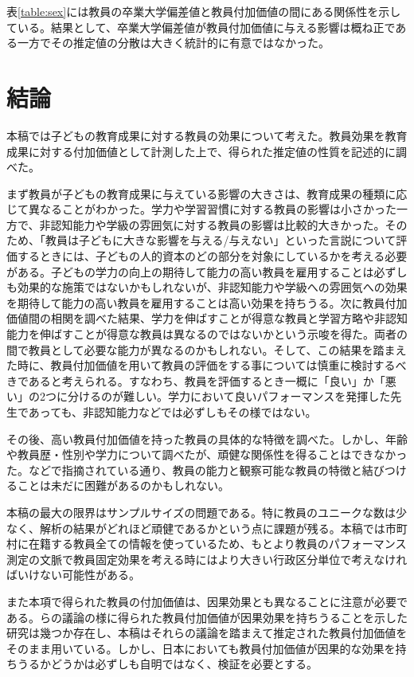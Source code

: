 \documentclass[a4paper,12pt]{article}
\begin{document}
表\ref{table:sex}には教員の卒業大学偏差値と教員付加価値の間にある関係性を示している。結果として、卒業大学偏差値が教員付加価値に与える影響は概ね正である一方でその推定値の分散は大きく統計的に有意ではなかった。

\section{結論\label{conclusion}}
本稿では子どもの教育成果に対する教員の効果について考えた。教員効果を教育成果に対する付加価値として計測した上で、得られた推定値の性質を記述的に調べた。

まず教員が子どもの教育成果に与えている影響の大きさは、教育成果の種類に応じて異なることがわかった。学力や学習習慣に対する教員の影響は小さかった一方で、非認知能力や学級の雰囲気に対する教員の影響は比較的大きかった。そのため、「教員は子どもに大きな影響を与える/与えない」といった言説について評価するときには、子どもの人的資本のどの部分を対象にしているかを考える必要がある。子どもの学力の向上の期待して能力の高い教員を雇用することは必ずしも効果的な施策ではないかもしれないが、非認知能力や学級への雰囲気への効果を期待して能力の高い教員を雇用することは高い効果を持ちうる。次に教員付加価値間の相関を調べた結果、学力を伸ばすことが得意な教員と学習方略や非認知能力を伸ばすことが得意な教員は異なるのではないかという示唆を得た。両者の間で教員として必要な能力が異なるのかもしれない。そして、この結果を踏まえた時に、教員付加価値を用いて教員の評価をする事については慎重に検討するべきであると考えられる。すなわち、教員を評価するとき一概に「良い」か「悪い」の2つに分けるのが難しい。学力において良いパフォーマンスを発揮した先生であっても、非認知能力などでは必ずしもその様ではない。

その後、高い教員付加価値を持った教員の具体的な特徴を調べた。しかし、年齢や教員歴・性別や学力について調べたが、頑健な関係性を得ることはできなかった。\cite{hanushek2006teacher}などで指摘されている通り、教員の能力と観察可能な教員の特徴と結びつけることは未だに困難があるのかもしれない。

本稿の最大の限界はサンプルサイズの問題である。特に教員のユニークな数は少なく、解析の結果がどれほど頑健であるかという点に課題が残る。本稿では市町村に在籍する教員全ての情報を使っているため、もとより教員のパフォーマンス測定の文脈で教員固定効果を考える時にはより大きい行政区分単位で考えなければいけない可能性がある。

また本項で得られた教員の付加価値は、因果効果とも異なることに注意が必要である。\cite{chetty2014measuring}らの議論の様に得られた教員付加価値が因果効果を持ちうることを示した研究は幾つか存在し、本稿はそれらの議論を踏まえて推定された教員付加価値をそのまま用いている。しかし、日本においても教員付加価値が因果的な効果を持ちうるかどうかは必ずしも自明ではなく、検証を必要とする。




\appendix
\end{document}
